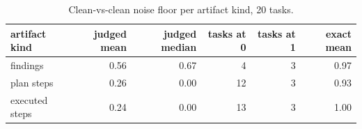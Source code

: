 \begin{table}[t]
\centering
\small
\begin{tabular}{lrrrrr}
\toprule
artifact kind & judged mean & judged median & tasks at 0 & tasks at 1 & exact mean \\
\midrule
findings & 0.56 & 0.67 & 4 & 3 & 0.97 \\
plan steps & 0.26 & 0.00 & 12 & 3 & 0.93 \\
executed steps & 0.24 & 0.00 & 13 & 3 & 1.00 \\
\bottomrule
\end{tabular}
\caption{Clean-vs-clean noise floor per artifact kind, 20 tasks.}
\label{tab:noise_floor}
\end{table}
